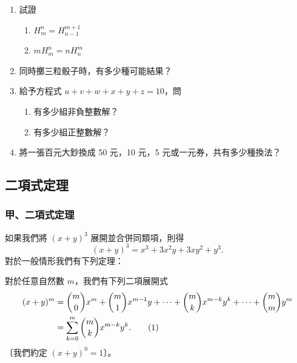 \begin{enumerate}[label=\textbf{\arabic*.}]
  \item[*8.] 試證
  \begin{enumerate}[label=(\arabic*)]
    \item $H_m^n = H_{n-1}^{m+1}$
    \item $m H_m^n = n H_n^m$
  \end{enumerate}
  \item 同時擲三粒骰子時，有多少種可能結果？
  \item[*10.] 給予方程式 $u + v + w + x + y + z = 10$，問
  \begin{enumerate}[label=(\arabic*)]
    \item 有多少組非負整數解？
    \item 有多少組正整數解？
  \end{enumerate}
  \item 將一張百元大鈔換成 50 元，10 元，5 元或一元券，共有多少種換法？
\end{enumerate}


\subsection{二項式定理}\label{sec:b5s-2-4}

\subsubsection*{甲、二項式定理}\label{subsec:b5s-2-4-a}

如果我們將 $(x + y)^3$ 展開並合併同類項，則得
\[ (x + y)^3 = x^3 + 3x^2 y + 3xy^2 + y^3. \]
對於一般情形我們有下列定理：

\medskip
\begin{theorem}[二項式定理]\label{thm:b5s-2-10}
對於任意自然數 $m$，我們有下列二項展開式
\begin{align}
(x + y)^m &= \binom{m}{0} x^m + \binom{m}{1} x^{m-1} y + \dotsb + \binom{m}{k} x^{m-k} y^k + \dotsb + \binom{m}{m} y^m \notag \\
&= \sum_{k=0}^m \binom{m}{k} x^{m-k} y^k. \label{eq:b5s-2-4-1}\tag{1}
\end{align}
〔我們約定 $(x + y)^0 = 1$〕。
\end{theorem}
